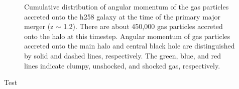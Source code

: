 \documentclass[manuscript]{aastex}
\begin{document}
\begin{figure}
\centerline{}
\caption[]{ Cumulative distribution of angular momentum of the gas particles accreted onto the h258 galaxy at the time of the primary major merger (z $\sim$ 1.2). There are about 450,000 gas particles accreted onto the halo at this timestep. Angular momentum of gas particles accreted onto the main halo and central black hole are distinguished by solid and dashed lines, respectively. The green, blue, and red lines indicate clumpy, unshocked, and shocked gas, respectively.}
\label{hrh258angmom_merger2} 
\end{figure}

Test

\end{document}
